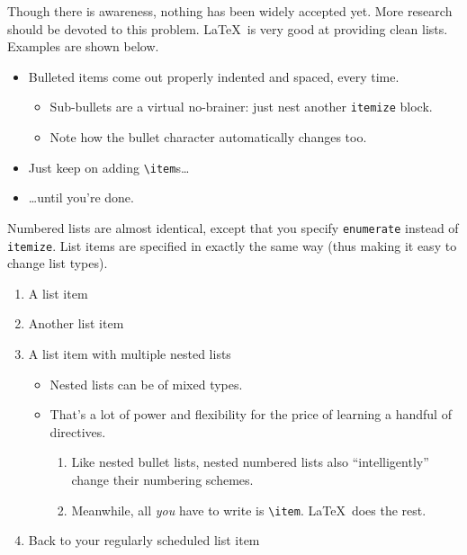 \documentclass{article}
\begin{document}
Though there is awareness, nothing has been widely accepted yet. More research should be devoted to this problem.
\LaTeX\ is very good at providing clean lists.  Examples are shown below.

\begin{itemize}
\item Bulleted items come out properly indented and spaced, every time.

\begin{itemize}
\item Sub-bullets are a virtual no-brainer: just nest another \verb!itemize! block.
\item Note how the bullet character automatically changes too.
\end{itemize}

\item Just keep on adding \verb!\item!s\ldots

\item \ldots until you're done.
\end{itemize}

Numbered lists are almost identical, except that you specify \verb!enumerate! instead of \verb!itemize!.  List items are specified in exactly the same way (thus making it easy to change list types).

\begin{enumerate}
\item A list item
\item Another list item
\item A list item with multiple nested lists

\begin{itemize}
\item Nested lists can be of mixed types.
\item That's a lot of power and flexibility for the price of learning a handful of directives.

\begin{enumerate}
\item Like nested bullet lists, nested numbered lists also ``intelligently'' change their numbering schemes.
\item Meanwhile, all \emph{you} have to write is \verb!\item!.  \LaTeX\ does the rest.
\end{enumerate}
\end{itemize}

\item Back to your regularly scheduled list item

\end{enumerate}
\end{document}
